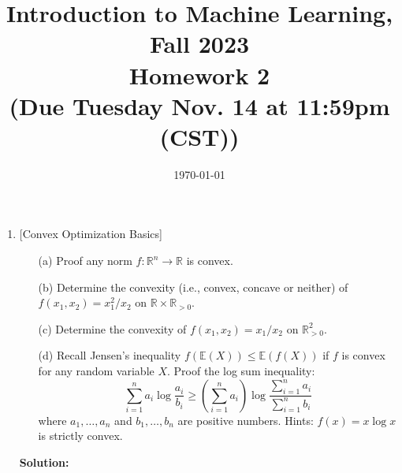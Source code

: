 \documentclass[10pt]{article}
\begin{document}
\date{\today}
\title{Introduction to Machine Learning, Fall 2023 \\
	Homework 2\\
	\small (Due Tuesday Nov. 14 at 11:59pm (CST))}
\maketitle

\begin{enumerate}[1.]


	\item {} [Convex Optimization Basics]
	      \begin{itemize}
		      \item[(a)] Proof any norm $f:\mathbb{R}^{n}\rightarrow\mathbb{R}$ is convex.~
		      \item[(b)] Determine the convexity (i.e., convex, concave or neither) of $f(x_1,x_2)=x_1^2/x_2$ on $\mathbb{R}\times\mathbb{R}_{>0}$.~
		      \item[(c)] Determine the convexity of $f(x_1,x_2)=x_1/x_2$ on $\mathbb{R}_{>0}^{2}$.~
			  \item[(d)] Recall Jensen's inequality $f(\mathbb{E}(X)) \leq \mathbb{E}(f(X))$ if $f$ is convex for any random variable $X$. 
			  Proof the log sum inequality: 
			  \[
				\sum_{i=1}^{n} a_i \log \frac{a_i}{b_i} \geq \left( \sum_{i=1}^{n} a_i\right) \log \frac{\sum_{i=1}^{n} a_i}{\sum_{i=1}^{n} b_i} 
			  \]
			  where $a_1,\ldots,a_n$ and $b_1,\ldots,b_n$ are positive numbers. Hints: $f(x)=x\log x$ is strictly convex.~
	      \end{itemize}


		  \textbf{Solution:}

	      \newpage


\end{enumerate}
\end{document}
